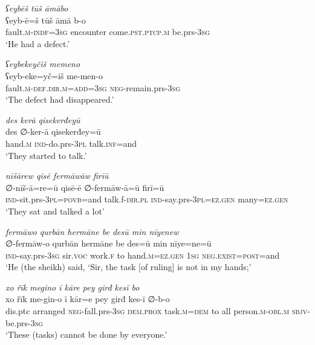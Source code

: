 \ea \label{ŠJ.81}
\textit{ʕeybēš tūš āmābo} \\ 
\gll ʕeyb-ē=š tūš āmā b-o \\ 
 fault\textsc{.m}\textsc{-indf}\textsc{=3sg} encounter come\textsc{.pst}\textsc{.ptcp}\textsc{.m} be.prs\textsc{-3sg} \\ 
\glt `He had a defect.'
\z 
 
\ea \label{ŠJ.82}
\textit{ʕeybekeyčiš memeno} \\ 
\gll ʕeyb-eke=yč=iš me-men-o \\ 
 fault\textsc{.m}\textsc{-def}\textsc{.dir}\textsc{.m}\textsc{=add}\textsc{=3sg} \textsc{neg-}remain.prs\textsc{-3sg} \\ 
\glt `The defect had disappeared.'
\z 
 
\ea \label{ŠJ.84}
\textit{des kerā qisekerđeyū} \\ 
\gll des ∅-ker-ā qisekerđey=ū \\ 
 hand\textsc{.m} \textsc{ind-}do.prs\textsc{-3pl} talk\textsc{.inf}=and \\ 
\glt `They started to talk.'
\z 
 
\ea \label{ŠJ.85}
\textit{nīšārew qisē fermāwāw firīū} \\ 
\gll ∅-nīš-ā=re=ū qisē-ē ∅-fermāw-ā=ū firī=ū \\ 
 \textsc{ind-}sit.prs\textsc{-3pl}\textsc{=\textsc{povb}}=and talk.f\textsc{-dir}\textsc{.pl} \textsc{ind-}say.prs\textsc{-3pl}\textsc{=ez.gen} many\textsc{=ez.gen} \\ 
\glt `They sat and talked a lot'
\z 
 
\ea \label{ŠJ.86}
\textit{fermāwo qurbān hermāne be desū min nīyenew} \\ 
\gll ∅-fermāw-o qurbān hermāne be des=ū min nīye=ne=ū \\ 
 \textsc{ind-}say.prs\textsc{-3sg} sir.\textsc{voc} work\textsc{.f} to hand\textsc{.m}\textsc{=ez.gen} \textsc{1sg} \textsc{\textsc{neg.}exist}\textsc{=\textsc{post}}=and \\ 
\glt `He (the sheikh) said, ‘Sir, the task [of ruling] is not in my hands;'
\z 
 
\ea \label{ŠJ.90}
\textit{xo řīk megino ī kāre pey girđ kesī bo} \\ 
\gll xo řīk me-gin-o ī kār=e pey girđ kes-ī ∅-b-o \\ 
 dis.ptc arranged \textsc{neg-}fall.prs\textsc{-3sg} \textsc{dem.prox} task\textsc{.m}\textsc{=dem} to all person\textsc{.m}\textsc{-obl}\textsc{.m} \textsc{sbjv-}be.prs\textsc{-3sg} \\ 
\glt `These (tasks) cannot be done by everyone.'
\z 
 

